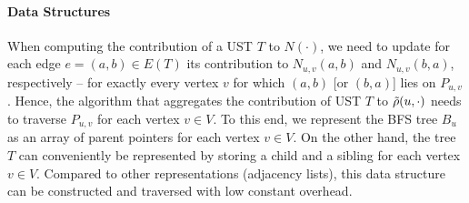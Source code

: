 \paragraph{Data Structures}
When computing the contribution of a UST $T$ to $N(\cdot)$, we need to update
for each edge $e = (a, b) \in E(T)$ its contribution to $N_{u, v}(a, b)$ and
$N_{u, v}(b, a)$, respectively -- for exactly every vertex $v$ for which $(a,
b)$ [or $(b, a)$] lies on $P_{u, v}$. Hence, the algorithm that aggregates the
contribution of UST $T$ to $\tilde{\rho}(u, \cdot)$ needs to traverse $P_{u, v}$
for each vertex $v \in V$. To this end, we represent the BFS tree $B_u$ as an
array of parent pointers for each vertex $v \in V$. On the other hand, the tree
$T$ can conveniently be represented by storing a child and a sibling for each
vertex $v \in V$. Compared to other representations (\eg adjacency lists), this
data structure can be constructed and traversed with low constant overhead.

